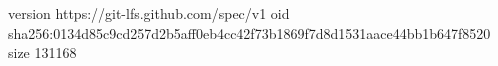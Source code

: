 version https://git-lfs.github.com/spec/v1
oid sha256:0134d85c9cd257d2b5aff0eb4cc42f73b1869f7d8d1531aace44bb1b647f8520
size 131168
